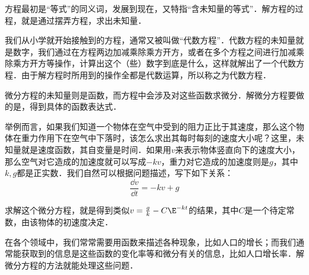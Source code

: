 
方程最初是“等式”的同义词，发展到现在，又特指“含未知量的等式”．解方程的过程，就是通过摆弄方程，求出未知量．

我们从小学就开始接触到的方程，通常又被叫做“代数方程”．代数方程的未知量就是数字，我们通过在方程两边加减乘除乘方开方，或者在多个方程之间进行加减乘除乘方开方等操作，计算出这个（些）数字到底是什么，这样就解出了一个代数方程．由于解方程时所用到的操作全都是代数运算，所以称之为代数方程．

微分方程的未知量则是函数，而方程中会涉及对这些函数求微分．解微分方程要做的是，得到具体的函数表达式．

举例而言，如果我们知道一个物体在空气中受到的阻力正比于其速度，那么这个物体在重力作用下在空气中下落时，该怎么求出其每时每刻的速度大小呢？这里，未知量就是速度函数，其自变量是时间．如果用$v$来表示物体竖直向下的速度大小，那么空气对它造成的加速度就可以写成$-kv$，重力对它造成的加速度则是$g$，其中$k, g$都是正实数．我们自然可以根据问题描述，写下如下关系：
\begin{equation}
\frac{\dd v}{\dd t}=-kv+g
\end{equation}

求解这个微分方程，就是得到类似$v=\frac{g}{k}- C\E^{-kt}$的结果，其中$C$是一个待定常数，由该物体的初速度决定．

在各个领域中，我们常常需要用函数来描述各种现象，比如人口的增长；而我们通常能获取到的信息是这些函数的变化率等和微分有关的信息，比如人口增长率．解微分方程的方法就能处理这些问题．

\subsection{}


















